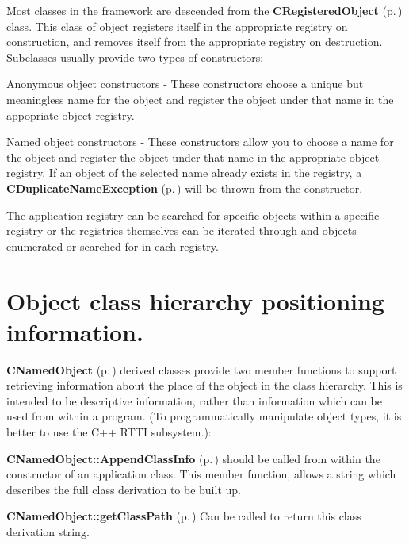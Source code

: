 Most classes in the framework are descended from the {\bf CRegistered\-Object} {\rm (p.\,\pageref{classCRegisteredObject})} class. This class of object registers itself in the appropriate registry on  construction, and removes itself from the appropriate registry on destruction. Subclasses usually provide two types of constructors:\begin{CompactItemize}
\item 
Anonymous object constructors - These constructors choose a unique but meaningless name for the object and register the object under that name in the appopriate object registry.\item 
Named object constructors - These constructors allow you to choose a name for the object and register the object under that name in the appropriate object registry. If an object of the selected name already exists in the registry, a {\bf CDuplicate\-Name\-Exception} {\rm (p.\,\pageref{classCDuplicateNameException})} will be thrown from the  constructor.\end{CompactItemize}
The application registry can be searched for specific objects within a  specific registry or the registries themselves can be iterated through and  objects enumerated or searched for in each registry.

\section{Object class hierarchy positioning information.}\label{Hierarchyinfo}


{\bf CNamed\-Object} {\rm (p.\,\pageref{classCNamedObject})} derived classes provide two member functions to support retrieving information about the place of the object in the class hierarchy. This is  intended to be descriptive information, rather than information which can be used from within a program. (To programmatically manipulate object types, it is better to use the C++ RTTI subsystem.):\begin{CompactItemize}
\item 
{\bf CNamed\-Object::Append\-Class\-Info} {\rm (p.\,\pageref{classCNamedObject_b2})} should be called from within the constructor of an application class. This member function, allows a string which describes the full class derivation to be built up.\item 
{\bf CNamed\-Object::get\-Class\-Path} {\rm (p.\,\pageref{classCNamedObject_a5})} Can be called to return this class derivation string.\end{CompactItemize}
